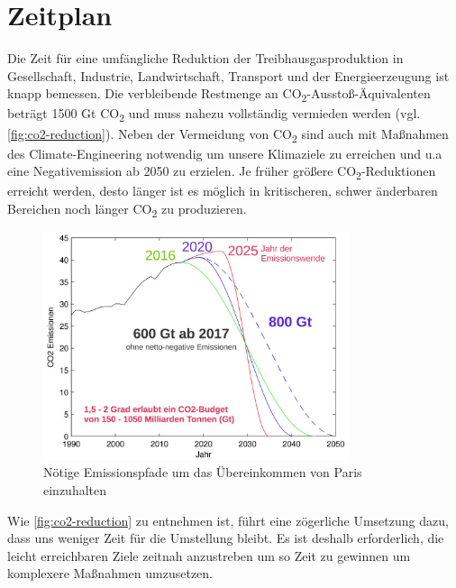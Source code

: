 \section{Zeitplan}

Die Zeit für eine umfängliche Reduktion der Treibhausgasproduktion in Gesellschaft, Industrie, Landwirtschaft, Transport und der Energieerzeugung ist knapp bemessen.
Die verbleibende Restmenge an CO\textsubscript{2}-Ausstoß-Äquivalenten beträgt 1500 Gt CO\textsubscript{2} und muss nahezu vollständig vermieden werden (vgl. \autoref{fig:co2-reduction}).
Neben der Vermeidung von CO\textsubscript{2} sind auch mit Maßnahmen des Climate-Engineering notwendig um unsere Klimaziele zu erreichen und u.a eine Negativemission ab 2050 zu erzielen.
Je früher größere CO\textsubscript{2}-Reduktionen erreicht werden, desto länger ist es möglich in kritischeren, schwer änderbaren Bereichen noch länger CO\textsubscript{2} zu produzieren.

\begin{figure}[!htb]
	\centering
	\includegraphics[width=0.8\textwidth]{emission-paths-for-reaching-the-paris-agreement.jpg}
	\caption{Nötige Emissionspfade um das Übereinkommen von Paris einzuhalten}
	\label{fig:co2-reduction}
\end{figure}

Wie \autoref{fig:co2-reduction} zu entnehmen ist, führt eine zögerliche Umsetzung dazu, dass uns weniger Zeit für die Umstellung bleibt.
Es ist deshalb erforderlich, die leicht erreichbaren Ziele zeitnah anzustreben um so Zeit zu gewinnen um komplexere Maßnahmen umzusetzen.


